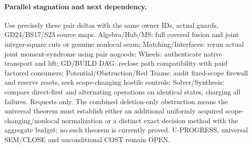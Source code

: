 \documentclass[11pt]{article}
\begin{document}
\paragraph{Parallel stagnation and next dependency.} Use precisely these pair deltas with the same owner IDs, actual guards, GD24/BS17/S23 source maps. Algebra/Hub/MS: full covered fusion and joint integer-square cuts or genuine nonlocal seam; Matching/Interfaces: rerun actual joint moment-syndrome using pair nogoods; Wheels: authenticate native transport and lift; GD/BUILD DAG: reclose path compatibility with paid factored consumers; Potential/Obstruction/Red Teams: audit fixed-scope firewall and reserve resets, seek scope-changing hostile controls; Solver/Synthesis: compare direct-first and alternating operations on identical states, charging all failures. Requests only. The combined deletion-only obstruction means the universal theorem must establish either an additional uniformly acquired scope-changing/nonlocal normalization or a distinct exact decision method with the aggregate budget; no such theorem is currently proved. U-PROGRESS, universal SEM/CLOSE and unconditional COST remain OPEN.
\end{document}
